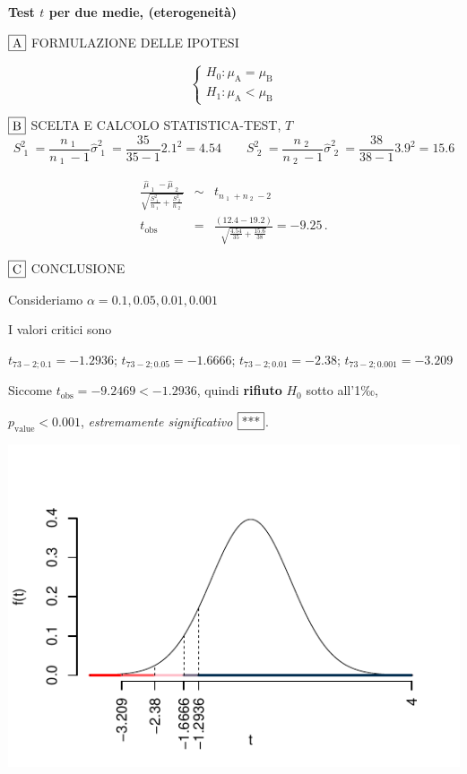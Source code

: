 \documentclass[
  11pt,
]{book}
\theoremstyle{mytheoremstyle}
\theoremstyle{mydefstyle}
\newenvironment{sol}
  {
  \begin{tcolorbox}[enhanced,breakable,arc=0.1mm,boxrule=1pt,colback=white,colframe=iblue,
  title=\bf \fontfamily{lmss}\selectfont \hspace{.5 cm} Soluzione,drop fuzzy shadow]

}{
\end{tcolorbox}
  }
\begin{document}
\begin{sol}
\textbf{Test \(t\) per due medie, (eterogeneità)}

\(\fbox{A}\) FORMULAZIONE DELLE IPOTESI

\[\begin{cases}
   H_0: \mu_\text{A} = \mu_\text{B} \\
   H_1: \mu_\text{A} < \mu_\text{B} 
   \end{cases}\]

\(\fbox{B}\) SCELTA E CALCOLO STATISTICA-TEST, \(T\)
\[
     S^2_\text{ 1 }=\frac{n_\text{ 1 }}{n_\text{ 1 }-1}\hat\sigma^2_\text{ 1 }=\frac{ 35 }{ 35 -1} 2.1 ^2= 4.54  \qquad
     S^2_\text{ 2 }=\frac{n_\text{ 2 }}{n_\text{ 2 }-1}\hat\sigma^2_\text{ 2 }=\frac{ 38 }{ 38 -1} 3.9 ^2= 15.6 
   \]

\begin{eqnarray*}
   \frac{\hat\mu_\text{ 1 } - \hat\mu_\text{ 2 }}
   {\sqrt{\frac {S^2_\text{ 1 }}{n_\text{ 1 }}+\frac {S^2_\text{ 2 }}{n_\text{ 2 }}}}&\sim&t_{n_\text{ 1 }+n_\text{ 2 }-2}\\
   t_{\text{obs}}
   &=& \frac{ ( 12.4 -  19.2 )} {\sqrt{\frac{ 4.54 }{ 35 }+\frac{ 15.6 }{ 38 }}}
   =   -9.25 \, .
   \end{eqnarray*}

\(\fbox{C}\) CONCLUSIONE

Consideriamo \(\alpha=0.1, 0.05, 0.01, 0.001\)

I valori critici sono

\(t_{73-2;0.1}=-1.2936\); \(t_{73-2;0.05}=-1.6666\); \(t_{73-2;0.01}=-2.38\); \(t_{73-2;0.001}=-3.209\)

Siccome \(t_\text{obs}=-9.2469<-1.2936\), quindi \textbf{rifiuto} \(H_0\) sotto all'1‰,

\(p_\text{value}<0.001\), \emph{estremamente significativo} \(\fbox{***}\).

\begin{center}\includegraphics{Esami_passati_con_soluzioni_files/figure-latex/2022-99-1} \end{center}


\end{sol}
\end{document}
